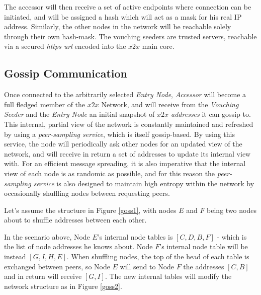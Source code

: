 The accessor will then receive a set of active endpoints where
connection can be initiated, and will be assigned a hash which will act
as a mask for his real IP address. Similarly, the other nodes in the
network will be reachable solely through their own hash-mask. The
vouching seeders are trusted servers, reachable via a secured
\emph{https url} encoded into the \(x2x\) main core.

\subsection{Gossip Communication}



Once connected to the arbitrarily selected \emph{Entry Node},
\emph{Accessor} will become a full fledged member of the \(x2x\)
Network, and will receive from the \emph{Vouching Seeder} and the
\emph{Entry Node} an initial snapshot of \emph{\(x2x\) addresses} it can
gossip to. This internal, partial view of the network is constantly
maintained and refreshed by using a \emph{peer-sampling service}, which
is itself gossip-based. By using this service, the node will
periodically ask other nodes for an updated view of the network, and
will receive in return a set of addresses to update its internal view
with. For an efficient message spreading, it is also imperative that the
internal view of each node is as randomic as possible, and for this
reason the \emph{peer-sampling service} is also designed to maintain
high entropy within the network by occasionally shuffling nodes between
requesting peers.

Let's assume the structure in Figure \ref{goss1}, with nodes \(E\) and \(F\)
being two nodes about to shuffle addresses between each other.

In the scenario above, Node \(E\)'s internal node tables is
\([C, D, B, F]\) - which is the list of node addresses he knows about.
Node \(F\)'s internal node table will be instead \([G, I, H, E]\). When
shuffling nodes, the top of the head of each table is exchanged between
peers, so Node \(E\) will send to Node \(F\) the addresses \([C,B]\) and
in return will receive \([G,I]\). The new internal tables will modify
the network structure as in Figure \ref{goss2}.

